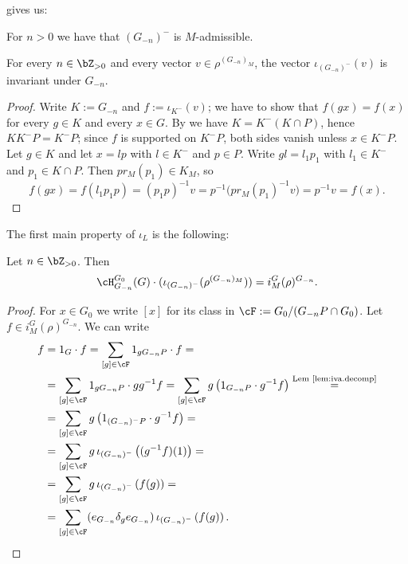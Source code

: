 \documentclass[12pt,a4paper]{amsart}%
\newcommand{\RamiA}[1]{{{#1}}}
\begin{document}
 gives us:
\begin{cor}\label{lem:Gn.M.adm}
    For $n>0$ we have that $(G_{-n})^-$ is $M$-admissible.
\end{cor}
\begin{lemma}\label{lem:iota.inv}
    For every $n\in \Z_{>0}$ and every vector $v\in \rho^{(G_{-n})_M}$, the vector
    $\iota_{(G_{-n})^-}(v)$ is invariant under $G_{-n}$.
\end{lemma}
\begin{proof}
Write $K:=G_{-n}$ and $f:=\iota_{K^-}(v)$; we have to show that $f(gx)=f(x)$ for every $g\in K$ and every $x\in G$. By  we have $K=K^-(K\cap P)$, hence $KK^-P=K^-P$; since $f$ is supported on $K^-P$, both sides vanish unless $x\in K^-P$. Let $g\in K$ and let $x=lp$ with $l\in K^-$ and $p\in P$. Write $gl=l_1p_1$ with $l_1\in K^-$ and $p_1\in K\cap P$. Then $pr_M(p_1)\in K_M$, so
$$f(gx)=f(l_1p_1p)=(p_1p)^{-1}v=p^{-1}\bigl(pr_M(p_1)^{-1}v\bigr)=p^{-1}v=f(x).$$
\end{proof}
\RamiA{The first main property of $\iota_L$ is the following:}
\begin{lemma}\label{lem:iota.gen}
Let $n\in \Z_{>0}$. Then
    $$\cH^{G_0}_{G_{-n}}(G)\cdot ( \iota_{(G_{-n})^-}(\rho^{(G_{-n})_M}))=i_M^G(\rho)^{G_{-n}}.$$
\end{lemma}
\begin{proof}
    For $x\in G_0$ we write $[x]$ for its class in $\cF:=G_0/(G_{-n}P\cap G_0)$.
    Let $f\in i_M^G(\rho)^{G_{-n}}$. We can write
\begin{align*}
f
&= 1_{G} \cdot f
 = \sum_{[g]\in \cF} 1_{gG_{-n}P }\cdot f =\\
&= \sum_{[g]\in \cF} 1_{gG_{-n}P}\cdot gg^{-1}f
 = \sum_{[g]\in \cF} g\left(1_{G_{-n}P}\cdot g^{-1}f\right) \overset{\text{Lem~\ref{lem:iva.decomp}}}{=}\\
& =\sum_{[g]\in \cF}
g\left(1_{(G_{-n})^-P}\cdot g^{-1}f\right) =\\
&= \sum_{[g]\in \cF}
g\,\iota_{(G_{-n})^-}\left((g^{-1}f)(1)\right) =\\
&= \sum_{[g]\in \cF}
g\,\iota_{(G_{-n})^-}\left(f(g)\right) =\\
&= \sum_{[g]\in \cF}
(e_{G_{-n}}\delta_g e_{G_{-n}})\,\iota_{(G_{-n})^-}\left(f(g)\right).
\end{align*}
\end{proof}
\end{document}
